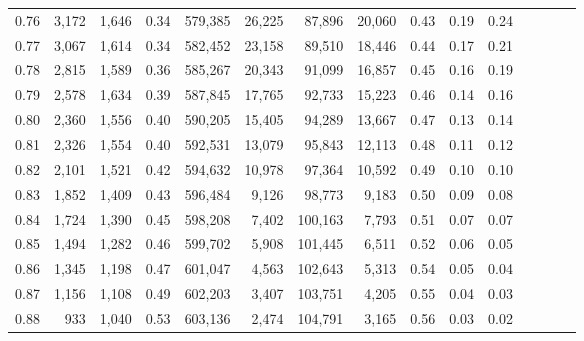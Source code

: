 \begin{tabular}{rrrcrrrrrrrrrrr}
0.76 &   3,172 &  1,646 &                                       0.34 &  579,385 &   26,225 &   87,896 &   20,060 &  0.43 &  0.19 &                         0.24 \\
0.77 &   3,067 &  1,614 &                                       0.34 &  582,452 &   23,158 &   89,510 &   18,446 &  0.44 &  0.17 &                         0.21 \\
0.78 &   2,815 &  1,589 &                                       0.36 &  585,267 &   20,343 &   91,099 &   16,857 &  0.45 &  0.16 &                         0.19 \\
0.79 &   2,578 &  1,634 &                                       0.39 &  587,845 &   17,765 &   92,733 &   15,223 &  0.46 &  0.14 &                         0.16 \\
0.80 &   2,360 &  1,556 &                                       0.40 &  590,205 &   15,405 &   94,289 &   13,667 &  0.47 &  0.13 &                         0.14 \\
0.81 &   2,326 &  1,554 &                                       0.40 &  592,531 &   13,079 &   95,843 &   12,113 &  0.48 &  0.11 &                         0.12 \\
0.82 &   2,101 &  1,521 &                                       0.42 &  594,632 &   10,978 &   97,364 &   10,592 &  0.49 &  0.10 &                         0.10 \\
0.83 &   1,852 &  1,409 &                                       0.43 &  596,484 &    9,126 &   98,773 &    9,183 &  0.50 &  0.09 &                         0.08 \\
0.84 &   1,724 &  1,390 &                                       0.45 &  598,208 &    7,402 &  100,163 &    7,793 &  0.51 &  0.07 &                         0.07 \\
0.85 &   1,494 &  1,282 &                                       0.46 &  599,702 &    5,908 &  101,445 &    6,511 &  0.52 &  0.06 &                         0.05 \\
0.86 &   1,345 &  1,198 &                                       0.47 &  601,047 &    4,563 &  102,643 &    5,313 &  0.54 &  0.05 &                         0.04 \\
0.87 &   1,156 &  1,108 &                                       0.49 &  602,203 &    3,407 &  103,751 &    4,205 &  0.55 &  0.04 &                         0.03 \\
0.88 &     933 &  1,040 &                                       0.53 &  603,136 &    2,474 &  104,791 &    3,165 &  0.56 &  0.03 &                         0.02 \\

\end{tabular}
